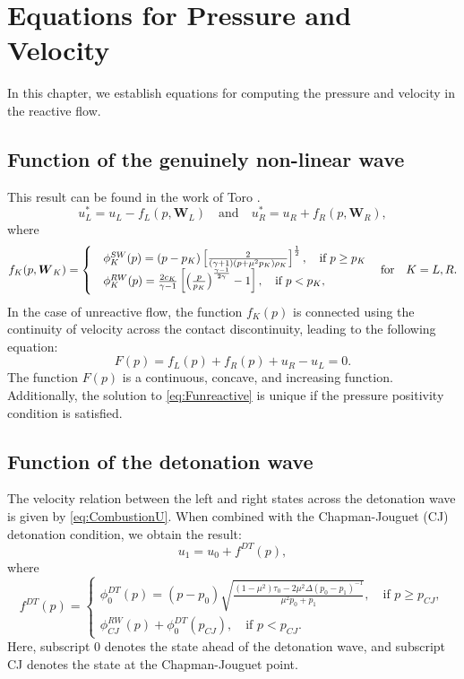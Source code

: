 \section{Equations for Pressure and Velocity}
In this chapter, we establish equations for computing the pressure and velocity in the reactive flow.
\subsection{Function of the genuinely non-linear wave}
This result can be found in the work of Toro \cite{toroRiemannSolversNumerical2009}.
\begin{equation}
u_L^* = u_L - f_L(p,\boldsymbol{W}_L) \quad \text{and} \quad u_R^* = u_R + f_R(p,\boldsymbol{W}_R),
\end{equation}
where
\begin{equation}
f_K(p,\boldsymbol{W}_K) =
\begin{cases}
\displaystyle
&\phi^{SW}_{K}(p) = (p-p_K) \left[ \frac{2}{(\gamma+1)(p+\mu^2 p_K)\rho_K} \right]^{\frac{1}{2}}, \quad \text{if } p\geq p_K \\
\displaystyle
&
\phi^{RW}_{K}(p) = 
\frac{2c_K}{\gamma-1} \left[ \left( \frac{p}{p_K} \right)^{\frac{\gamma-1}{2\gamma}} - 1 \right], \quad \text{if } p<p_K,
\end{cases}
\quad
\text{for} \quad K = L,R.
\end{equation}
In the case of unreactive flow, the function $f_K(p)$ is connected using the continuity of velocity across the contact discontinuity, leading to the following equation:
\begin{equation}
F(p) = f_L(p) + f_R(p) + u_R - u_L = 0.
\label{eq:Funreactive}
\end{equation}
The function $F(p)$ is a continuous, concave, and increasing function.
Additionally, the solution to \eqref{eq:Funreactive} is unique if the pressure positivity condition is satisfied.
\subsection{Function of the detonation wave}
The velocity relation between the left and right states across the detonation wave is given by \eqref{eq:CombustionU}. When combined with the Chapman-Jouguet (CJ) detonation condition, we obtain the result:
\begin{equation}
u_1 = u_0 + f^{DT}(p), 
\end{equation}
where
\begin{equation}
f^{DT}(p) =
\begin{cases}
\displaystyle
\phi^{DT}_0(p)=
(p-p_0)\sqrt{\frac{(1-\mu^2)\tau_0-2\mu^2 \Delta (p_0-p_1)^{-1}}{\mu^2p_0+p_1}}, \quad \text{if } p\geq p_{CJ}, \\
\displaystyle
\phi^{RW}_{CJ}(p)+ \phi^{DT}_{0}(p_{CJ}), \quad \text{if } p<p_{CJ}.
\end{cases}
\end{equation}
Here, subscript 0 denotes the state ahead of the detonation wave, and subscript CJ denotes the state at the Chapman-Jouguet point.

